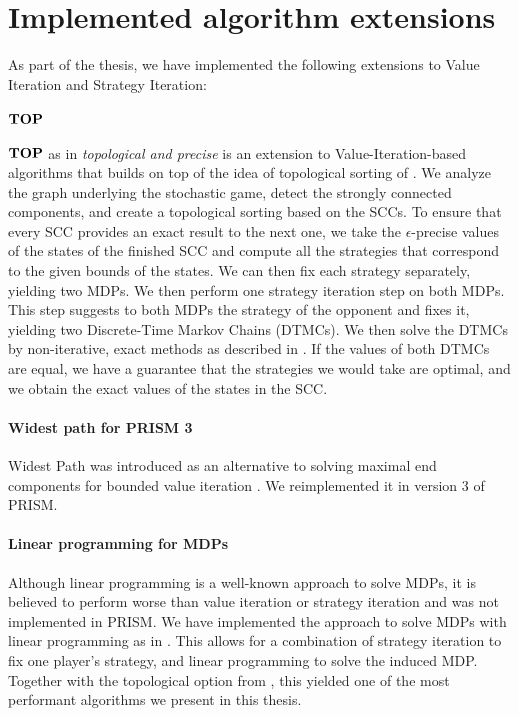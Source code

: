 \chapter{Implemented algorithm extensions} \label{ch:implementedAlgos}
As part of the thesis, we have implemented the following extensions to Value Iteration and Strategy Iteration:

\subsubsection*{$\mathbf{TOP}$} $\mathbf{TOP}$ as in \emph{topological and precise} is an extension to Value-Iteration-based algorithms that builds on top of the idea of topological sorting of \cite{gandalf}.
We analyze the graph underlying the stochastic game, detect the strongly connected components, and create a topological sorting based on the SCCs.
To ensure that every SCC provides an exact result to the next one, we take the $\epsilon$-precise values of the states of the finished SCC and compute all the
strategies that correspond to the given bounds of the states.
We can then fix each strategy separately, yielding two MDPs. We then perform one strategy iteration step on both MDPs. This step suggests to both MDPs the strategy
of the opponent and fixes it, yielding two Discrete-Time Markov Chains (DTMCs). We then solve the DTMCs by non-iterative, exact methods as described in \cite{BaierBook}.
If the values of both DTMCs are equal, we have a guarantee that the strategies we would take are optimal, and we obtain the exact values of the states in the SCC.

\subsubsection*{Widest path for PRISM 3}
Widest Path was introduced as an alternative to solving maximal end components for bounded value iteration \cite{widestPath}.
We reimplemented it in version 3 of PRISM.

\subsubsection*{Linear programming for MDPs}
Although linear programming is a well-known approach to solve MDPs, it is believed to perform worse than value iteration or strategy iteration
and was not implemented in PRISM. We have implemented the approach to solve MDPs with linear programming as in \cite{Puterman}. 
This allows for a combination of strategy iteration to fix one player's strategy, and linear programming to solve the induced MDP.
Together with the topological option from \cite{gandalf}, this yielded one of the most performant algorithms we present in this thesis.